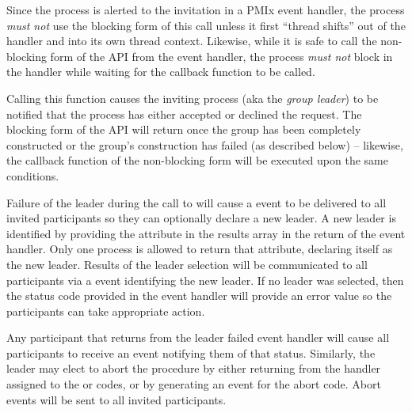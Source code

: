 \adviceuserstart
Since the process is alerted to the invitation in a \ac{PMIx} event handler, the process \emph{must not} use the blocking form of this call unless it first ``thread shifts'' out of the handler and into its own thread context. Likewise, while it is safe to call the non-blocking form of the \ac{API} from the event handler, the process \emph{must not} block in the handler while waiting for the callback function to be called.
\adviceuserend

Calling this function causes the inviting process (aka the \emph{group leader}) to be notified that the process has either accepted or declined the request. The blocking form of the \ac{API} will return once the group has been completely constructed or the group’s construction has failed (as described below) – likewise, the callback function of the non-blocking form will be executed upon the same conditions.

Failure of the leader during the call to  will cause a  event to be delivered to all invited participants so they can optionally declare a new leader. A new leader is identified by providing the  attribute in the results array in the return of the event handler. Only one process is allowed to return that attribute, declaring itself as the new leader. Results of the leader selection will be communicated to all participants via a  event identifying the new leader. If no leader was selected, then the status code provided in the event handler will provide an error value so the participants can take appropriate action.

Any participant that returns  from the leader failed event handler will cause all participants to receive an event notifying them of that status. Similarly, the leader may elect to abort the procedure by either returning  from the handler assigned to the  or  codes, or by generating an event for the abort code. Abort events will be sent to all invited participants.


\subsection{}


